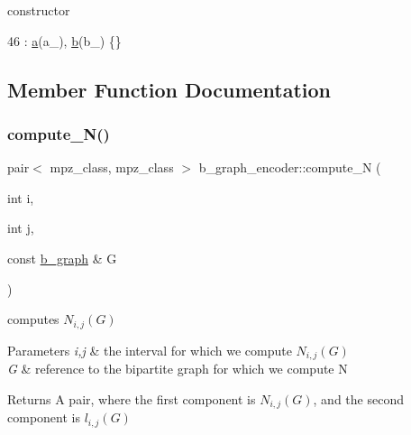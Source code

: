 constructor 


\begin{DoxyCode}
46 : \hyperlink{classb__graph__encoder_afd22d167f495cd85b41397f337c377c2}{a}(a\_), \hyperlink{classb__graph__encoder_a767826e268702e45ab71565e096a52b8}{b}(b\_) \{\}
\end{DoxyCode}


\subsection{Member Function Documentation}
\mbox{\label{classb__graph__encoder_a3ffcfb945e8563d01e683fc5e5127d6d}} 
\subsubsection{\texorpdfstring{compute\+\_\+\+N()}{compute\_N()}}
{\footnotesize\ttfamily pair$<$ mpz\+\_\+class, mpz\+\_\+class $>$ b\+\_\+graph\+\_\+encoder\+::compute\+\_\+N (\begin{DoxyParamCaption}\item[{int}]{i,  }\item[{int}]{j,  }\item[{const \hyperlink{classb__graph}{b\+\_\+graph} \&}]{G }\end{DoxyParamCaption})}



computes $N_{i,j}(G)$ 


\begin{DoxyParams}{Parameters}
{\em i,j} & the interval for which we compute $N_{i,j}(G)$ \\
\hline
{\em G} & reference to the bipartite graph for which we compute N \\
\hline
\end{DoxyParams}
\begin{DoxyReturn}{Returns}
A pair, where the first component is $N_{i,j}(G)$, and the second component is $l_{i,j}(G)$ 
\end{DoxyReturn}

